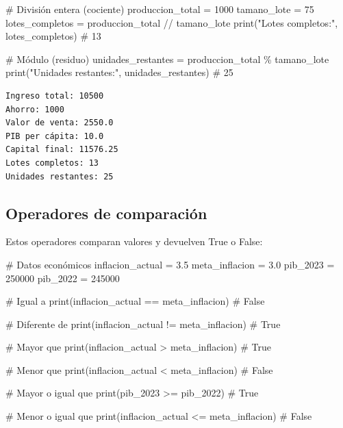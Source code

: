 \documentclass[
  doc,
  floatsintext,
  longtable,
  a4paper,
  nolmodern,
  notxfonts,
  notimes,
  12pt,
  colorlinks=true,linkcolor=blue,citecolor=blue,urlcolor=blue]{apa7}
\newenvironment{Shaded}{\begin{snugshade}}{\end{snugshade}}
\newcommand{\BuiltInTok}[1]{\textcolor[rgb]{0.00,0.23,0.31}{#1}}
\newcommand{\CommentTok}[1]{\textcolor[rgb]{0.37,0.37,0.37}{#1}}
\newcommand{\DecValTok}[1]{\textcolor[rgb]{0.68,0.00,0.00}{#1}}
\newcommand{\FloatTok}[1]{\textcolor[rgb]{0.68,0.00,0.00}{#1}}
\newcommand{\NormalTok}[1]{\textcolor[rgb]{0.00,0.23,0.31}{#1}}
\newcommand{\OperatorTok}[1]{\textcolor[rgb]{0.37,0.37,0.37}{#1}}
\newcommand{\StringTok}[1]{\textcolor[rgb]{0.13,0.47,0.30}{#1}}
\begin{document}
\begin{Shaded}
\begin{Highlighting}[]
\CommentTok{\# División entera (cociente)}
\NormalTok{produccion\_total }\OperatorTok{=} \DecValTok{1000}
\NormalTok{tamano\_lote }\OperatorTok{=} \DecValTok{75}
\NormalTok{lotes\_completos }\OperatorTok{=}\NormalTok{ produccion\_total }\OperatorTok{//}\NormalTok{ tamano\_lote}
\BuiltInTok{print}\NormalTok{(}\StringTok{"Lotes completos:"}\NormalTok{, lotes\_completos)  }\CommentTok{\# 13}

\CommentTok{\# Módulo (residuo)}
\NormalTok{unidades\_restantes }\OperatorTok{=}\NormalTok{ produccion\_total }\OperatorTok{\%}\NormalTok{ tamano\_lote}
\BuiltInTok{print}\NormalTok{(}\StringTok{"Unidades restantes:"}\NormalTok{, unidades\_restantes)  }\CommentTok{\# 25}
\end{Highlighting}
\end{Shaded}

\begin{verbatim}
Ingreso total: 10500
Ahorro: 1000
Valor de venta: 2550.0
PIB per cápita: 10.0
Capital final: 11576.25
Lotes completos: 13
Unidades restantes: 25
\end{verbatim}

\subsection{Operadores de
comparación}\label{operadores-de-comparaciuxf3n}

Estos operadores comparan valores y devuelven True o False:

\begin{Shaded}
\begin{Highlighting}[]
\CommentTok{\# Datos económicos}
\NormalTok{inflacion\_actual }\OperatorTok{=} \FloatTok{3.5}
\NormalTok{meta\_inflacion }\OperatorTok{=} \FloatTok{3.0}
\NormalTok{pib\_2023 }\OperatorTok{=} \DecValTok{250000}
\NormalTok{pib\_2022 }\OperatorTok{=} \DecValTok{245000}

\CommentTok{\# Igual a}
\BuiltInTok{print}\NormalTok{(inflacion\_actual }\OperatorTok{==}\NormalTok{ meta\_inflacion)  }\CommentTok{\# False}

\CommentTok{\# Diferente de}
\BuiltInTok{print}\NormalTok{(inflacion\_actual }\OperatorTok{!=}\NormalTok{ meta\_inflacion)  }\CommentTok{\# True}

\CommentTok{\# Mayor que}
\BuiltInTok{print}\NormalTok{(inflacion\_actual }\OperatorTok{\textgreater{}}\NormalTok{ meta\_inflacion)  }\CommentTok{\# True}

\CommentTok{\# Menor que}
\BuiltInTok{print}\NormalTok{(inflacion\_actual }\OperatorTok{\textless{}}\NormalTok{ meta\_inflacion)  }\CommentTok{\# False}

\CommentTok{\# Mayor o igual que}
\BuiltInTok{print}\NormalTok{(pib\_2023 }\OperatorTok{\textgreater{}=}\NormalTok{ pib\_2022)  }\CommentTok{\# True}

\CommentTok{\# Menor o igual que}
\BuiltInTok{print}\NormalTok{(inflacion\_actual }\OperatorTok{\textless{}=}\NormalTok{ meta\_inflacion)  }\CommentTok{\# False}
\end{Highlighting}
\end{Shaded}
\end{document}
